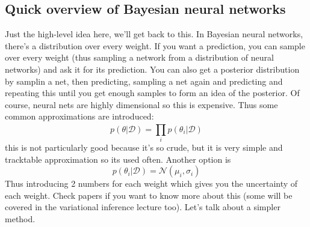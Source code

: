 \documentclass{report}
\begin{document}
\subsection{Quick overview of Bayesian neural networks}
Just the high-level idea here, we'll get back to this.
In Bayesian neural networks, there's a distribution over every weight.
If you want a prediction, you can sample over every weight (thus sampling a network from a distribution of neural networks)
and ask it for its prediction. You can also get a posterior distribution by samplin a net, then predicting, sampling a net again and predicting and repeating
this until you get enough samples to form an idea of the posterior.
Of course, neural nets are highly dimensional so this is expensive. Thus some common approximations are introduced:
\begin{equation}
		p(\theta| \mathcal{D}) = \prod_{i}^{} p(\theta_i|\mathcal{D}) 
\end{equation}
this is not particularly good because it's so crude, but it is very simple and tracktable approximation so its used often.
Another option is
\begin{equation}
		p(\theta_i|\mathcal{D}) = \mathcal{N}(\mu_i, \sigma_i)
\end{equation}
Thus introducing 2 numbers for each weight which gives you the uncertainty of each weight.
Check papers if you want to know more about this (some will be covered in the variational inference lecture too).
Let's talk about a simpler method.
\end{document}
